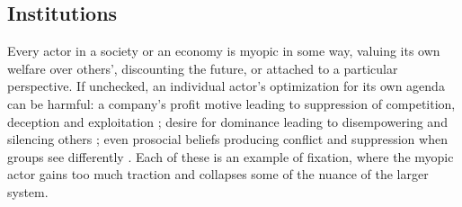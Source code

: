 \documentclass[11pt]{article}
\newcommand{\new}[1]{\textcolor{teal}{#1}}
\begin{document}




\subsection*{Institutions}

Every actor in a society or an economy is myopic in some way, valuing its own welfare over others', discounting the future, or attached to a particular perspective. If unchecked, an individual actor's optimization for its own agenda can be harmful: a company's profit motive leading to suppression of competition, deception and exploitation \citep{bakan2006corporation}; desire for dominance leading to disempowering and silencing others \citep{sidanius2001social}; even prosocial beliefs producing conflict and suppression when groups see differently \citep{haidt2012righteous}. Each of these is an example of fixation, where the myopic actor gains too much traction and collapses some of the nuance of the larger system.
\end{document}
